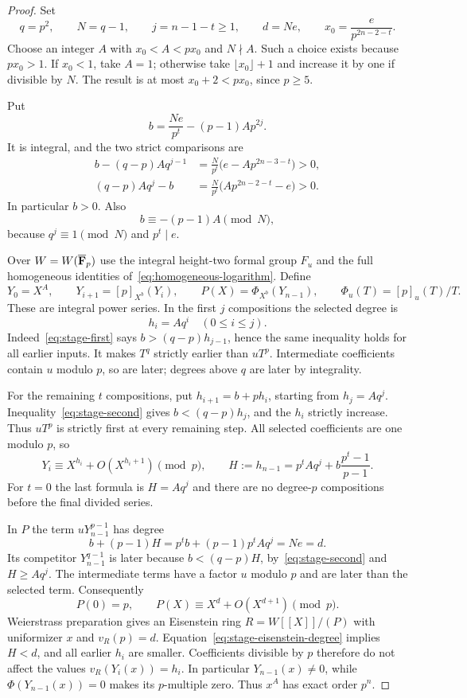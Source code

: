 \begin{proof}
Set
\[
 q=p^2,\qquad N=q-1,\qquad j=n-1-t\ge1,\qquad d=Ne,
 \qquad x_0=\frac e{p^{2n-2-t}}.
\]
Choose an integer $A$ with $x_0<A<px_0$ and $N\nmid A$. Such a choice exists because $px_0>1$. If $x_0<1$, take $A=1$; otherwise take $\lfloor x_0\rfloor+1$ and increase it by one if divisible by $N$. The result is at most $x_0+2<px_0$, since $p\ge5$.

Put
\[
                       b=\frac{Ne}{p^t}-(p-1)Ap^{2j}.
\]
It is integral, and the two strict comparisons are
\begin{align}
 b-(q-p)Aq^{j-1}
   &=\frac N{p^t}\bigl(e-Ap^{2n-3-t}\bigr)>0,
       \label{eq:stage-first}\\
 (q-p)Aq^j-b
   &=\frac N{p^t}\bigl(Ap^{2n-2-t}-e\bigr)>0.
       \label{eq:stage-second}
\end{align}
In particular $b>0$. Also
\begin{equation}\label{eq:stage-descent-congruence}
                         b\equiv-(p-1)A\pmod N,
\end{equation}
because $q^j\equiv1\pmod N$ and $p^t\mid e$.

Over $W=W(\overline{\mathbf F}_p)$ use the integral height-two formal group $F_u$ and the full homogeneous identities of~\eqref{eq:homogeneous-logarithm}. Define
\[
 Y_0=X^A,\qquad Y_{i+1}=[p]_{X^b}(Y_i),\qquad
 P(X)=\Phi_{X^b}(Y_{n-1}),\qquad \Phi_u(T)=[p]_u(T)/T.
\]
These are integral power series. In the first $j$ compositions the selected degree is
\[
                             h_i=Aq^i\quad(0\le i\le j).
\]
Indeed~\eqref{eq:stage-first} says $b>(q-p)h_{j-1}$, hence the same inequality holds for all earlier inputs. It makes $T^q$ strictly earlier than $uT^p$. Intermediate coefficients contain $u$ modulo $p$, so are later; degrees above $q$ are later by integrality.

For the remaining $t$ compositions, put $h_{i+1}=b+ph_i$, starting from $h_j=Aq^j$. Inequality~\eqref{eq:stage-second} gives $b<(q-p)h_j$, and the $h_i$ strictly increase. Thus $uT^p$ is strictly first at every remaining step. All selected coefficients are one modulo $p$, so
\[
 Y_i\equiv X^{h_i}+O(X^{h_i+1})\pmod p,
 \qquad H:=h_{n-1}=p^tAq^j+b\frac{p^t-1}{p-1}.
\]
For $t=0$ the last formula is $H=Aq^j$ and there are no degree-$p$ compositions before the final divided series.

In $P$ the term $uY_{n-1}^{p-1}$ has degree
\begin{equation}\label{eq:stage-eisenstein-degree}
 b+(p-1)H=p^tb+(p-1)p^tAq^j=Ne=d.
\end{equation}
Its competitor $Y_{n-1}^{q-1}$ is later because $b<(q-p)H$, by~\eqref{eq:stage-second} and $H\ge Aq^j$. The intermediate terms have a factor $u$ modulo $p$ and are later than the selected term. Consequently
\[
                    P(0)=p,\qquad P(X)\equiv X^d+O(X^{d+1})\pmod p.
\]
Weierstrass preparation gives an Eisenstein ring $R=W[[X]]/(P)$ with uniformizer $x$ and $v_R(p)=d$. Equation~\eqref{eq:stage-eisenstein-degree} implies $H<d$, and all earlier $h_i$ are smaller. Coefficients divisible by $p$ therefore do not affect the values $v_R(Y_i(x))=h_i$. In particular $Y_{n-1}(x)\ne0$, while $\Phi(Y_{n-1}(x))=0$ makes its $p$-multiple zero. Thus $x^A$ has exact order $p^n$.


\end{proof}
